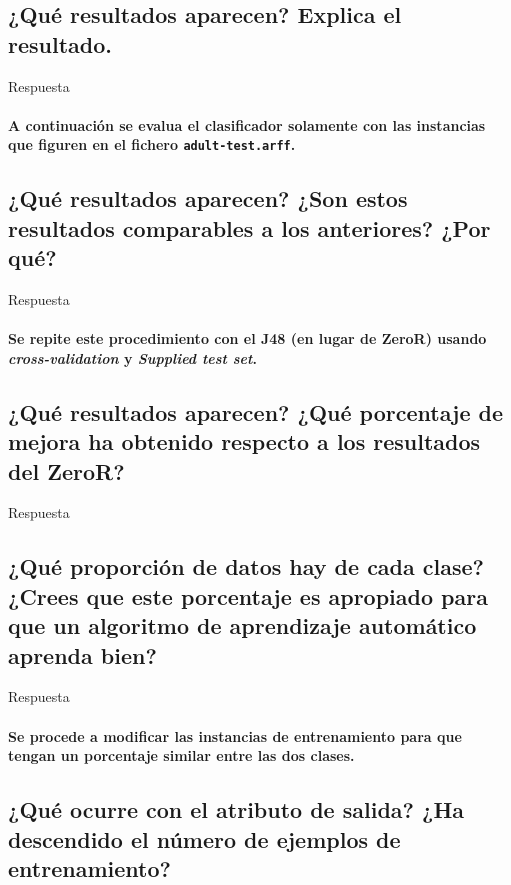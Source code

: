 \documentclass[12pt]{article}
\begin{document}
\subsection{\small ¿Qué resultados aparecen? Explica el resultado.}

Respuesta

\paragraph{\small A continuación se evalua el clasificador solamente con las
instancias que figuren en el fichero \texttt{adult-test.arff}.}

\subsection{\small ¿Qué resultados aparecen? ¿Son estos resultados comparables a los
anteriores? ¿Por qué?}

Respuesta

\paragraph{\small Se repite este procedimiento con el J48 (en lugar de ZeroR) usando
\emph{cross-validation} y \emph{Supplied test set}.}

\subsection{\small ¿Qué resultados aparecen? ¿Qué porcentaje de mejora ha obtenido
respecto a los resultados del ZeroR?}

Respuesta

\subsection{\small ¿Qué proporción de datos hay de cada clase? ¿Crees que este
porcentaje es apropiado para que un algoritmo de aprendizaje automático aprenda
bien?}

Respuesta

\paragraph{\small Se procede a modificar las instancias de entrenamiento para que
tengan un porcentaje similar entre las dos clases.}
\subsection{\small ¿Qué ocurre con el atributo de salida? ¿Ha descendido el número de
ejemplos de entrenamiento?}
\end{document}
